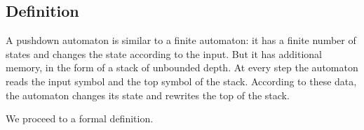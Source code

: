 

\setcounter{section}{6}
\setcounter{subsection}{1}
\setcounter{dfn}{0}

\subsection{Definition}
A pushdown automaton is similar to a finite automaton:
it has a finite number of states and changes the state according to the input.
But it has additional memory, in the form of a stack of unbounded depth.
At every step the automaton reads the input symbol and the top symbol of the stack.
According to these data, the automaton changes its state and rewrites the top of the stack.

We proceed to a formal definition.

